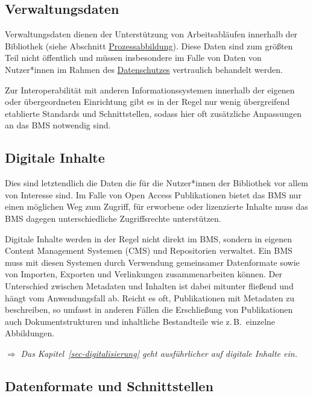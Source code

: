 \documentclass[
  11pt,
  letterpaper,
  DIV=11,
  twoside]{scrreprt}
\begin{document}
\subsection{Verwaltungsdaten}\label{verwaltungsdaten}

Verwaltungsdaten dienen der Unterstützung von Arbeitsabläufen innerhalb
der Bibliothek (siehe Abschnitt
\hyperref[prozessabbildung]{Prozessabbildung}). Diese Daten sind zum
größten Teil nicht öffentlich und müssen insbesondere im Falle von Daten
von Nutzer*innen im Rahmen des \hyperref[datenschutz-etc]{Datenschutzes}
vertraulich behandelt werden.

Zur Interoperabilität mit anderen Informationssystemen innerhalb der
eigenen oder übergeordneten Einrichtung gibt es in der Regel nur wenig
übergreifend etablierte Standards und Schnittstellen, sodass hier oft
zusätzliche Anpassungen an das BMS notwendig sind.

\subsection{Digitale Inhalte}\label{digitale-inhalte}

Dies sind letztendlich die Daten die für die Nutzer*innen der Bibliothek
vor allem von Interesse sind. Im Falle von Open Access Publikationen
bietet das BMS nur einen möglichen Weg zum Zugriff, für erworbene oder
lizenzierte Inhalte muss das BMS dagegen unterschiedliche Zugriffsrechte
unterstützen.

Digitale Inhalte werden in der Regel nicht direkt im BMS, sondern in
eigenen Content Management Systemen (CMS) und Repositorien verwaltet.
Ein BMS muss mit diesen Systemen durch Verwendung gemeinsamer
Datenformate sowie von Importen, Exporten und Verlinkungen
zusammenarbeiten können. Der Unterschied zwischen Metadaten und Inhalten
ist dabei mitunter fließend und hängt vom Anwendungsfall ab. Reicht es
oft, Publikationen mit Metadaten zu beschreiben, so umfasst in anderen
Fällen die Erschließung von Publikationen auch Dokumentstrukturen und
inhaltliche Bestandteile wie z.\,B.~einzelne Abbildungen.

\(\Rightarrow\) \emph{Das Kapitel~\ref{sec-digitalisierung} geht
ausführlicher auf digitale Inhalte ein.}

\subsection{Datenformate und
Schnittstellen}\label{datenformate-und-schnittstellen}
\end{document}
